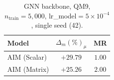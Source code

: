 %
%

\begin{table}[t]
\centering
\caption{GNN backbone, QM9, $n_{\text{train}}=5{,}000$, lr\_model$=5\times10^{-4}$,
single seed (42).}
\label{tab:gnn_lr5e4_only}
\begin{tabular}{lcc}
\toprule
Model & $\Delta_m(\%)_{\mu}$ & MR \\
\midrule
AIM (Scalar) & $\mathbf{+29.79}$ & $\mathbf{1.00}$ \\
AIM (Matrix) & $+25.26$          & $2.00$ \\
\bottomrule
\end{tabular}
\end{table}

